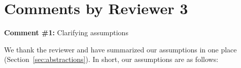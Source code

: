 

%  
% 
% 
% 
% 



\section*{Comments by Reviewer 3}

\noindent
\textbf{Comment \#1:} Clarifying assumptions
\begin{quote}
\end{quote}

We thank the reviewer and have summarized our assumptions in one place (Section~\ref{sec:abstractions}).
In short, our assumptions are as follows:

